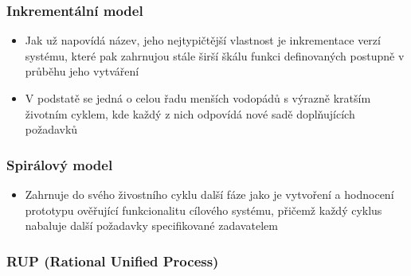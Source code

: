 \documentclass[10pt,a4paper]{article}
\begin{document}
\subsubsection{Inkrementální model}

\begin{itemize}
\item Jak už napovídá název, jeho nejtypičtější vlastnost je inkrementace verzí systému, které pak zahrnujou stále širší škálu funkci definovaných postupně v průběhu jeho vytváření
\item V podstatě se jedná o celou řadu menších vodopádů s výrazně kratším životním cyklem, kde každý z nich odpovídá nové sadě doplňujících požadavků
\end{itemize}
\subsubsection{Spirálový model}

\begin{itemize}
\item Zahrnuje do svého živostního cyklu další fáze jako je vytvoření a hodnocení prototypu ověřující funkcionalitu cílového systému, přičemž každý cyklus nabaluje další požadavky specifikované zadavatelem
\end{itemize}
\subsubsection{RUP (Rational Unified Process)}
\end{document}
